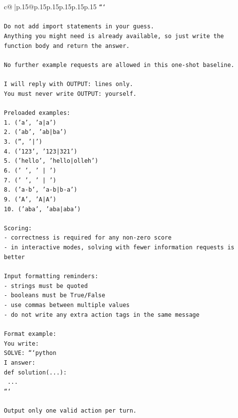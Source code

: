 \documentclass{article}
\begin{document}
{\begin{supertabular}{c@{$\;$}|p{.15\linewidth}@{}p{.15\linewidth}p{.15\linewidth}p{.15\linewidth}p{.15\linewidth}p{.15\linewidth}}
{{{\texttt{```} \\
\\ 
\texttt{Do not add import statements in your guess.} \\
\texttt{Anything you might need is already available, so just write the function body and return the answer.} \\
\\ 
\texttt{No further example requests are allowed in this one{-}shot baseline.} \\
\\ 
\texttt{I will reply with OUTPUT: lines only.} \\
\texttt{You must never write OUTPUT: yourself.} \\
\\ 
\texttt{Preloaded examples:} \\
\texttt{1. ('a', 'a|a')} \\
\texttt{2. ('ab', 'ab|ba')} \\
\texttt{3. ('', '|')} \\
\texttt{4. ('123', '123|321')} \\
\texttt{5. ('hello', 'hello|olleh')} \\
\texttt{6. ('   ', '   |   ')} \\
\texttt{7. (' ', ' | ')} \\
\texttt{8. ('a{-}b', 'a{-}b|b{-}a')} \\
\texttt{9. ('A', 'A|A')} \\
\texttt{10. ('aba', 'aba|aba')} \\
\\ 
\texttt{Scoring:} \\
\texttt{{-} correctness is required for any non{-}zero score} \\
\texttt{{-} in interactive modes, solving with fewer information requests is better} \\
\\ 
\texttt{Input formatting reminders:} \\
\texttt{{-} strings must be quoted} \\
\texttt{{-} booleans must be True/False} \\
\texttt{{-} use commas between multiple values} \\
\texttt{{-} do not write any extra action tags in the same message} \\
\\ 
\texttt{Format example:} \\
\texttt{You write:} \\
\texttt{SOLVE: ```python} \\
\texttt{I answer:} \\
\texttt{def solution(...):} \\
\texttt{    ...} \\
\texttt{```} \\
\\ 
\texttt{Output only one valid action per turn.} \\
            }
        }
    }
     \\ \\


\end{supertabular}}
\end{document}
